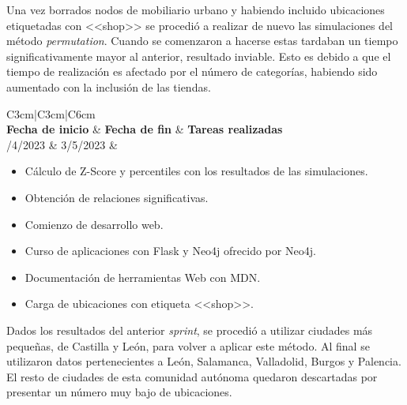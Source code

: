 Una vez borrados nodos de mobiliario urbano y habiendo incluido ubicaciones etiquetadas con <<shop>> se procedió a realizar de nuevo las simulaciones del método \textit{permutation}. Cuando se comenzaron a hacerse estas tardaban un tiempo significativamente mayor al anterior, resultado inviable. Esto es debido a que el tiempo de realización es afectado por el número de categorías, habiendo sido aumentado con la inclusión de las tiendas.


\begin{table}[h!]
	\centering
	\begin{tabular}{C{3cm}|C{3cm}|C{6cm}} 
		\\
		\midrule
		\textbf{Fecha de inicio} & \textbf{Fecha de fin} & \textbf{Tareas realizadas}\\
		/4/2023 & 3/5/2023 & \begin{itemize}[left=0pt]
			\item Cálculo de Z-Score y percentiles con los resultados de las simulaciones.
			\item Obtención de relaciones significativas.
			\item Comienzo de desarrollo web.
			\item Curso de aplicaciones con Flask y Neo4j ofrecido por Neo4j.
			\item Documentación de herramientas Web con MDN.
			\item Carga de ubicaciones con etiqueta <<shop>>.

		\end{itemize}\tabularnewline
		\bottomrule
	\end{tabular}
	\caption{Tabla del \textit{sprint} 6}
	\label{tabsprint6}
\end{table}

\newpage
Dados los resultados del anterior \textit{sprint}, se procedió a utilizar ciudades más pequeñas, de Castilla y León, para volver a aplicar este método. Al final se utilizaron datos pertenecientes a León, Salamanca, Valladolid, 
Burgos y Palencia. El resto de ciudades de esta comunidad autónoma quedaron descartadas por presentar un número muy bajo de ubicaciones.

